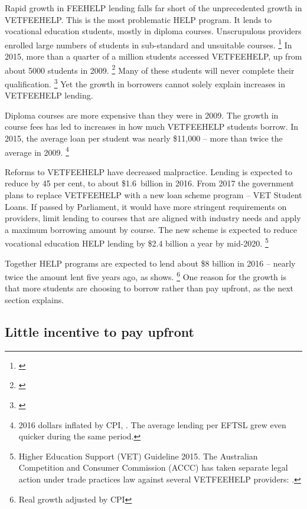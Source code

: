 \documentclass[embargoed]{grattan}
\begin{document}
Rapid growth in \gls{FEEHELP} lending falls far short of the unprecedented growth in \gls{VETFEEHELP}.
This is the most problematic \gls{HELP} program.
It lends to vocational education students, mostly in diploma courses.
Unscrupulous providers enrolled large numbers of students in sub-standard and unsuitable courses.%
\footnote{\textcite{Education2015Gettingourmoneys}} In 2015, more than a quarter of a million students accessed \gls{VETFEEHELP}, up from about 5000 students in 2009.%
\footnote{\textcite[][14]{Ryan2016RedesigningVETFEE}} Many of these students will never complete their qualification.%
\footnote{\textcite{NCVER2015preliminaryanalysisoutcomes}} Yet the growth in borrowers cannot solely explain increases in \gls{VETFEEHELP} lending.

Diploma courses are more expensive than they were in 2009.
The growth in course fees has led to increases in how much \gls{VETFEEHELP} students borrow.
In 2015, the average loan per student was nearly \$11,000 -- more than twice the average in 2009.%
\footnote{2016 dollars inflated by \gls{CPI}, \textcite[][17]{Ryan2016RedesigningVETFEE}.
The average lending per \gls{EFTSL} grew even quicker during the same period.}

Reforms to \gls{VETFEEHELP} have decreased malpractice.
Lending is expected to reduce by 45 per cent, to about \$1.6~billion in 2016.
From 2017 the government plans to replace \gls{VETFEEHELP} with a new loan scheme program -- VET Student Loans.
If passed by Parliament, it would have more stringent requirements on providers, limit lending to courses that are aligned with industry needs and apply a maximum borrowing amount by course.
The new scheme is expected to reduce vocational education \gls{HELP} lending by \$2.4 billion a year by mid-2020.%
\footnote{Higher Education Support (VET) Guideline 2015.
The Australian Competition and Consumer Commission (ACCC) has taken separate legal action under trade practices law against several \gls{VETFEEHELP} providers: \textcites{Birmingham2016MediareleaseNew}{ACCC2015ACCCtakesaction}.}

Together \gls{HELP} programs are expected to lend about \$8 billion in 2016 -- nearly twice the amount lent five years ago, as  shows.%
\footnote{Real growth adjusted by \gls{CPI}} One reason for the growth is that more students are choosing to borrow rather than pay upfront, as the next section explains.

\subsection{Little incentive to pay upfront}\label{subsec:little-incentive-to-pay-upfront}
\end{document}
